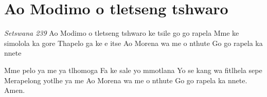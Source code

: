 \starttocol
\chapter{Ao Modimo o tletseng tshwaro}
\nexttocol
\hfill{\it Setswana 239}
\stoptocol
\starttocol
\startlines
{\sc Ao Modimo} o tletseng tshwaro
ke tsile go go rapela
Mme ke simolola ka gore
Thapelo ga ke e itse
Ao Morena wa me o nthute
Go go rapela ka nnete

Mme pelo ya me ya tlhomoga
Fa ke sale yo mmotlana
Yo se kang wa fitlhela sepe
Merapelong yotlhe ya me
Ao Morena wa me o nthute
Go go rapela ka nnete.
\hfill Amen.
\stoplines
\nexttocol

\stoptocol
